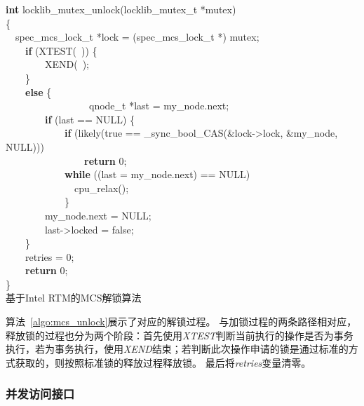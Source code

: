 \begin{algorithm}[htbp]
\textbf{int} locklib\_mutex\_unlock(locklib\_mutex\_t *mutex) \\
\{\\
    ~~spec\_mcs\_lock\_t *lock = (spec\_mcs\_lock\_t *) mutex;\\

    ~~~~\textbf{if} (XTEST(~)) \{\\
        ~~~~~~~~XEND(~);\\
    ~~~~\} \\
    ~~~~\textbf{else} \{ \\
        ~~~~~~~~\
        ~~~~~~~~qnode\_t *last = my\_node.next; \\
        ~~~~~~~~\textbf{if} (last == NULL) \{ \\
            ~~~~~~~~~~~~\textbf{if} (likely(true == \_sync\_bool\_CAS(\&lock->lock, \&my\_node, NULL))) \\
                	~~~~~~~~~~~~~~~~\textbf{return} 0; \\

            ~~~~~~~~~~~~\textbf{while} ((last = my\_node.next) == NULL) \\
                	~~~~~~~~~~~~~~cpu\_relax(); \\
            ~~~~~~~~~~~~\} \\

        ~~~~~~~~my\_node.next = NULL; \\
        ~~~~~~~~last->locked = false; \\
    ~~~~\} \\

    ~~~~retries = 0; \\
    ~~~~\textbf{return} 0; \\
\}\\
\caption{基于Intel RTM的MCS解锁算法}
\label{algo:mcs_unlock}
\end{algorithm}

算法~\ref{algo:mcs_unlock}展示了对应的解锁过程。
与加锁过程的两条路径相对应，释放锁的过程也分为两个阶段：首先使用\textit{XTEST}判断当前执行的操作是否为事务执行，若为事务执行，使用\textit{XEND}结束；若判断此次操作申请的锁是通过标准的方式获取的，则按照标准锁的释放过程释放锁。
最后将\textit{retries}变量清零。

\subsubsection{并发访问接口}

